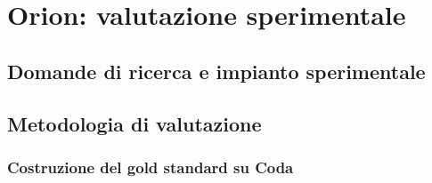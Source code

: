 %

\chapter{Orion: valutazione sperimentale}
\label{chap:orion-valutazione}

\section{Domande di ricerca e impianto sperimentale}
\label{sec:eval-research-questions}
%
%

\section{Metodologia di valutazione}
\label{sec:eval-metodologia}

\subsection{Costruzione del gold standard su Coda}
\label{subsec:eval-gold-standard}
%
%

